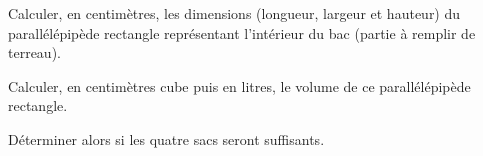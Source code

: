 {}
\begin{myenumerate}
  \item Calculer, en centimètres, les dimensions (longueur, largeur et
    hauteur) du parallélépipède rectangle représentant l'intérieur du
    bac (partie à remplir de terreau).
  \item Calculer, en centimètres cube puis en litres, le volume de ce
    parallélépipède rectangle.
  \item Déterminer alors si les quatre sacs seront suffisants.
\end{myenumerate}